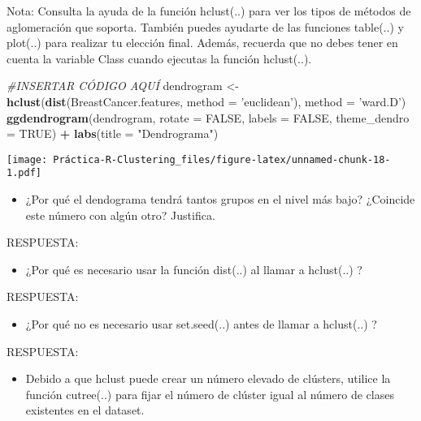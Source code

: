 \documentclass[]{article}
\newenvironment{Shaded}{\begin{snugshade}}{\end{snugshade}}
\newcommand{\CommentTok}[1]{\textcolor[rgb]{0.56,0.35,0.01}{\textit{#1}}}
\newcommand{\DataTypeTok}[1]{\textcolor[rgb]{0.13,0.29,0.53}{#1}}
\newcommand{\KeywordTok}[1]{\textcolor[rgb]{0.13,0.29,0.53}{\textbf{#1}}}
\newcommand{\NormalTok}[1]{#1}
\newcommand{\OperatorTok}[1]{\textcolor[rgb]{0.81,0.36,0.00}{\textbf{#1}}}
\newcommand{\OtherTok}[1]{\textcolor[rgb]{0.56,0.35,0.01}{#1}}
\newcommand{\StringTok}[1]{\textcolor[rgb]{0.31,0.60,0.02}{#1}}
\providecommand{\tightlist}{%
  \setlength{\itemsep}{0pt}\setlength{\parskip}{0pt}}
\begin{document}
Nota: Consulta la ayuda de la función hclust(..) para ver los tipos de
métodos de aglomeración que soporta. También puedes ayudarte de las
funciones table(..) y plot(..) para realizar tu elección final. Además,
recuerda que no debes tener en cuenta la variable Class cuando ejecutas
la función hclust(..).

\begin{Shaded}
\begin{Highlighting}[]
\CommentTok{#INSERTAR CÓDIGO AQUÍ}
\NormalTok{dendrogram <-}\StringTok{ }\KeywordTok{hclust}\NormalTok{(}\KeywordTok{dist}\NormalTok{(BreastCancer.features, }\DataTypeTok{method =} \StringTok{'euclidean'}\NormalTok{), }\DataTypeTok{method =} \StringTok{'ward.D'}\NormalTok{)}
\KeywordTok{ggdendrogram}\NormalTok{(dendrogram, }\DataTypeTok{rotate =} \OtherTok{FALSE}\NormalTok{, }\DataTypeTok{labels =} \OtherTok{FALSE}\NormalTok{, }\DataTypeTok{theme_dendro =} \OtherTok{TRUE}\NormalTok{) }\OperatorTok{+}\StringTok{ }\KeywordTok{labs}\NormalTok{(}\DataTypeTok{title =} \StringTok{"Dendrograma"}\NormalTok{)}
\end{Highlighting}
\end{Shaded}

\texttt{[image: Práctica-R-Clustering\_files/figure-latex/unnamed-chunk-18-1.pdf]}

\begin{itemize}
\tightlist
\item
  ¿Por qué el dendograma tendrá tantos grupos en el nivel más bajo?
  ¿Coincide este número con algún otro? Justifica.
\end{itemize}

RESPUESTA:

\begin{itemize}
\tightlist
\item
  ¿Por qué es necesario usar la función dist(..) al llamar a hclust(..)
  ?
\end{itemize}

RESPUESTA:

\begin{itemize}
\tightlist
\item
  ¿Por qué no es necesario usar set.seed(..) antes de llamar a
  hclust(..) ?
\end{itemize}

RESPUESTA:

\begin{itemize}
\tightlist
\item
  Debido a que hclust puede crear un número elevado de clústers, utilice
  la función cutree(..) para fijar el número de clúster igual al número
  de clases existentes en el dataset.
\end{itemize}
\end{document}
